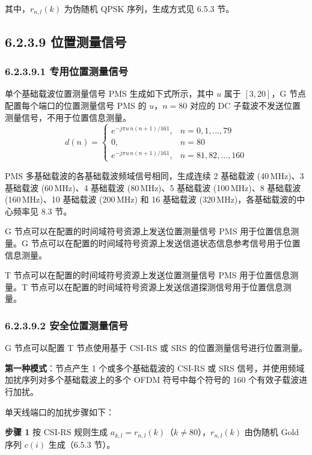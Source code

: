 \documentclass[11pt,a4paper]{ctexart}
\begin{document}
其中，$r_{n,l}(k)$ 为伪随机 QPSK 序列，生成方式见 6.5.3 节。

\subsection{6.2.3.9 位置测量信号}

\subsubsection{6.2.3.9.1 专用位置测量信号}

单个基础载波位置测量信号 PMS 生成如下式所示，其中 $u$ 属于 $[3, 20]$，G 节点配置每个端口的位置测量信号 PMS 的 $u$，$n = 80$ 对应的 DC 子载波不发送位置测量信号，不用于位置信息测量。
\begin{equation}
d(n) =
\begin{cases}
e^{-j\pi u\, n (n+1) / 161}, & n = 0, 1, \ldots, 79 \\[0.3em]
0, & n = 80 \\[0.3em]
e^{-j\pi u\, n (n+1) / 161}, & n = 81, 82, \ldots, 160
\end{cases}
\end{equation}

PMS 多基础载波的各基础载波频域信号相同，生成连续 2 基础载波 (40\,MHz)、3 基础载波 (60\,MHz)、4 基础载波 (80\,MHz)、5 基础载波 (100\,MHz)、8 基础载波 (160\,MHz)、10 基础载波 (200\,MHz) 和 16 基础载波 (320\,MHz)，各基础载波的中心频率见 8.3 节。

G 节点可以在配置的时间域符号资源上发送位置测量信号 PMS 用于位置信息测量。G 节点可以在配置的时间域符号资源上发送信道状态信息参考信号用于位置信息测量。

T 节点可以在配置的时间域符号资源上发送位置测量信号 PMS 用于位置信息测量。T 节点可以在配置的时间域符号资源上发送信道探测信号用于位置信息测量。

\subsubsection{6.2.3.9.2 安全位置测量信号}

G 节点可以配置 T 节点使用基于 CSI-RS 或 SRS 的位置测量信号进行位置测量。

\textbf{第一种模式}：节点产生 1 个或多个基础载波的 CSI-RS 或 SRS 信号，并使用频域加扰序列对多个基础载波上的多个 OFDM 符号中每个符号的 160 个有效子载波进行加扰。

单天线端口的加扰步骤如下：

\textbf{步骤 1} 按 CSI-RS 规则生成 $a_{k,l} = r_{n,l}(k)$（$k \neq 80$），$r_{n,l}(k)$ 由伪随机 Gold 序列 $c(i)$ 生成（6.5.3 节）。
\end{document}
